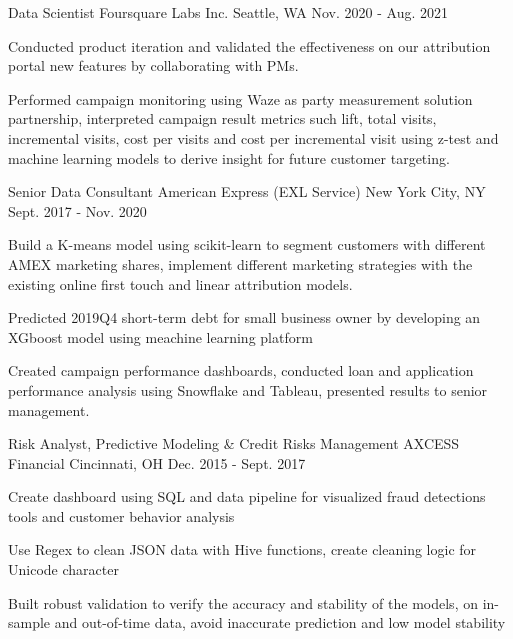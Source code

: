 \begin{cventries}
	\cventry
	{Data Scientist} %
	{Foursquare Labs Inc.} %
	{Seattle, WA} %
	{Nov. 2020 - Aug. 2021} %
	{
		\begin{cvitems}
			\item{Conducted product iteration and validated the effectiveness on our attribution portal new features by collaborating with PMs.}
			\item{Performed campaign monitoring using Waze as  party measurement solution partnership, interpreted campaign result metrics such lift, total visits, incremental visits, cost per visits and cost per incremental visit using z-test and machine learning models to derive insight for future customer targeting.}
		\end{cvitems}
	}


	\cventry
	{Senior Data Consultant} %
	{American Express (EXL Service)} %
	{New York City, NY} %
	{Sept. 2017 - Nov. 2020}
	{
		\begin{cvitems}
			\item{Build a K-means model using scikit-learn to segment customers with different AMEX marketing shares, implement different marketing strategies with the existing online first touch and linear attribution models.}
			\item{Predicted 2019Q4 short-term debt for small business owner by developing an XGboost model using meachine learning platform}
			\item{Created campaign performance dashboards, conducted loan and application performance analysis using Snowflake and Tableau, presented results to senior management.}
		\end{cvitems}
	}



	\cventry
	{Risk Analyst, Predictive Modeling \& Credit Risks Management} %
	{AXCESS Financial} %
	{Cincinnati, OH} %
	{Dec. 2015 - Sept. 2017} %
	{
		\begin{cvitems}
			\item{Create dashboard using SQL and data pipeline for visualized fraud detections tools and customer behavior analysis}
			\item{Use Regex to clean JSON data with Hive functions, create cleaning logic for Unicode character}
			\item{Built robust validation to verify the accuracy and stability of the models, on in-sample and out-of-time data, avoid inaccurate prediction and low model stability}
		\end{cvitems}
	}



\end{cventries}